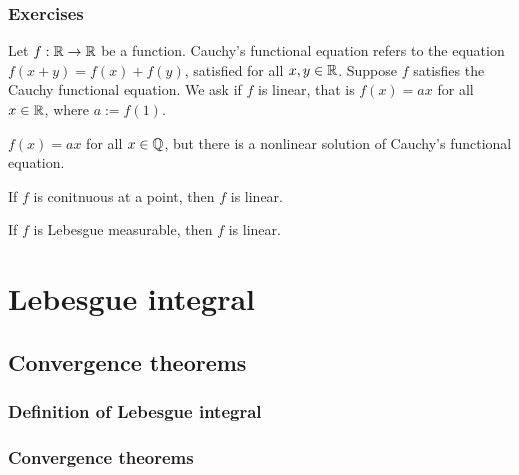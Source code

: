 \documentclass{../../large}
\begin{document}
\section*{Exercises}
\begin{prb}
Let $f:\mathbb{R}\to\mathbb{R}$ be a function.
Cauchy's functional equation refers to the equation $f(x+y)=f(x)+f(y)$, satisfied for all $x,y\in\mathbb{R}$.
Suppose $f$ satisfies the Cauchy functional equation.
We ask if $f$ is linear, that is $f(x)=ax$ for all $x\in\mathbb{R}$, where $a:=f(1)$.
\begin{parts}
\item $f(x)=ax$ for all $x\in\mathbb{Q}$, but there is a nonlinear solution of Cauchy's functional equation.
\item If $f$ is conitnuous at a point, then $f$ is linear.
\item If $f$ is Lebesgue measurable, then $f$ is linear.
\end{parts}
\end{prb}











\part{Lebesgue integral}


\chapter{Convergence theorems}
\section{Definition of Lebesgue integral}
\section{Convergence theorems}


\begin{prb}
\end{prb}
\end{document}
